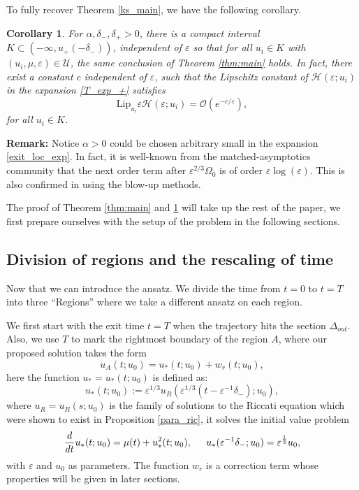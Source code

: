 \documentclass[letterpaper,11pt]{article}
\newcommand{\rmO}{\mathcal{O}}
\newcommand{\eps}{\varepsilon}
\numberwithin{equation}{section}
\theoremstyle{plain}
\newtheorem{corollary}[theorem]{Corollary}
\begin{document}
To fully recover Theorem \ref{ks_main}, we have the following corollary.
\begin{corollary}\label{cor:main}
For $\alpha,\delta_-,\delta_+>0$, there is a compact interval $K \subset (-\infty, u_+(-\delta_-))$, independent of $\eps$ so that for all $u_i \in K$ with $(u_i,\mu,\eps) \in \mathcal{U}$, the same conclusion of Theorem \ref{thm:main} holds. In fact, there exist a constant $c$ independent of $\eps$, such that the Lipschitz constant of $\mathcal{H}(\eps;u_i)$ in the expansion \eqref{T_exp_+} satisfies
\begin{equation}\label{T_remainder_exp_+}
\text{Lip}_{u_i} \eps\mathcal{H}(\eps;u_i) = \rmO(e^{-c/\eps}),
\end{equation}
for all $u_i \in K$.
\end{corollary}



\textbf{Remark:} Notice $\alpha>0$ could be chosen arbitrary small in the expansion \eqref{exit_loc_exp}. In fact, it is well-known from the matched-asymptotics community that the next order term after $\eps^{2/3}\Omega_0$ is of order $\eps \log(\eps)$.  This is also confirmed in \citep{KrupaSz} using the blow-up methods. 


 The proof of Theorem \ref{thm:main} and \ref{cor:main} will take up the rest of the paper,  we first prepare ourselves with the setup of the problem in the following sections.

\subsection{Division of regions and the rescaling of time}\label{t_sigma}
Now that we can introduce the ansatz. We divide the time from $t=0$ to $t=T$ into three ``Regions'' where we take a different ansatz on each region. 

We first start with the exit time $t=T$ when the trajectory hits the section $\Delta_{out}$. Also, we use $T$ to mark the rightmost boundary of the region $A$, where our proposed solution takes the form
\[
u_A(t; u_0) = u_*(t;u_0)  + w_r(t;u_0),
\]
here the function $u_* = u_*(t; u_0)$ is defined as:
\begin{equation}\label{urdef}
u_*(t; u_0) := \eps^{1/3}u_R(\eps^{1/3}(t-\eps^{-1}\delta_-); u_0),
\end{equation}
where $u_R=u_R(s; u_0)$ is the family of solutions to the Riccati equation which were shown to exist in Proposition \ref{para_ric}, it solves the initial value problem
\begin{equation}\label{ureq}
\frac{d}{dt}u_*(t; u_0) = \mu(t) + u_*^2(t; u_0), \hspace{0.2in} u_*(\eps^{-1}\delta_-; u_0) = \eps^{\frac{1}{3}} u_0,
\end{equation}
with $\eps$ and $u_0$ as parameters.  The function $w_r$ is a correction term whose properties will be given in later sections. 
\end{document}
